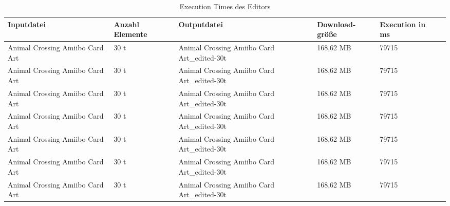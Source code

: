 \begin{table}[!htbp]
	\centering
	\begin{tabular}{|p{3cm}|p{2cm}|p{3cm}|p{2cm}|p{2cm}|p{2cm}|}
		\hline
		\textbf{Inputdatei}					& \textbf{Anzahl Elemente}					& \textbf{Outputdatei}								& \textbf{Download-größe}	& \textbf{Execution in ms} 	\\ 
		\hline
		Animal Crossing Amiibo Card Art		& 30 t 								& Animal Crossing Amiibo Card Art\_edited-30t	& 168,62 MB					& 79715  					\\
		Animal Crossing Amiibo Card Art		& 30 t 								& Animal Crossing Amiibo Card Art\_edited-30t	& 168,62 MB					& 79715  					\\
		Animal Crossing Amiibo Card Art		& 30 t 								& Animal Crossing Amiibo Card Art\_edited-30t	& 168,62 MB					& 79715  					\\
		Animal Crossing Amiibo Card Art		& 30 t 								& Animal Crossing Amiibo Card Art\_edited-30t	& 168,62 MB					& 79715  					\\
		Animal Crossing Amiibo Card Art		& 30 t 								& Animal Crossing Amiibo Card Art\_edited-30t	& 168,62 MB					& 79715  					\\
		Animal Crossing Amiibo Card Art		& 30 t 								& Animal Crossing Amiibo Card Art\_edited-30t	& 168,62 MB					& 79715  					\\
		Animal Crossing Amiibo Card Art		& 30 t 								& Animal Crossing Amiibo Card Art\_edited-30t	& 168,62 MB					& 79715  					\\
		\hline
	\end{tabular}
	\caption{Execution Times des Editors}
	\label{table:editor-dur}
\end{table}